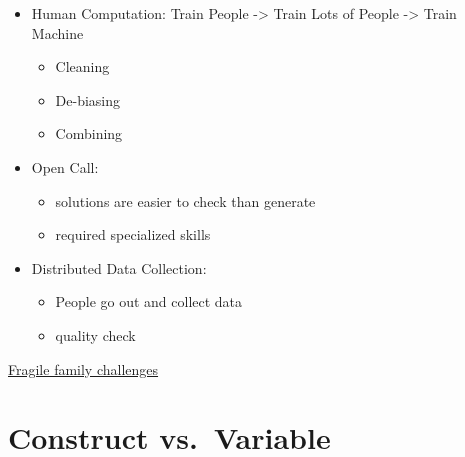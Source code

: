 \documentclass[
]{book}
\begin{document}
\begin{itemize}
\item
  Human Computation: Train People -\textgreater{} Train Lots of People -\textgreater{} Train Machine

  \begin{itemize}
  \item
    Cleaning
  \item
    De-biasing
  \item
    Combining
  \end{itemize}
\item
  Open Call:

  \begin{itemize}
  \item
    solutions are easier to check than generate
  \item
    required specialized skills
  \end{itemize}
\item
  Distributed Data Collection:

  \begin{itemize}
  \item
    People go out and collect data
  \item
    quality check
  \end{itemize}
\end{itemize}

\href{https://www.fragilefamilieschallenge.org/}{Fragile family challenges}

\hypertarget{construct-vs.-variable-1}{%
\chapter{Construct vs.~Variable}\label{construct-vs.-variable-1}}
\end{document}
